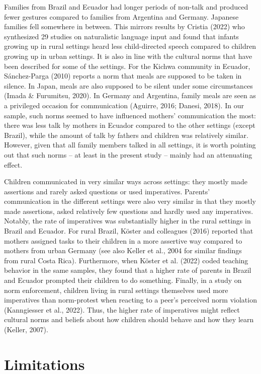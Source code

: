 \documentclass[
  man,floatsintext]{apa6}
\begin{document}
Families from Brazil and Ecuador had longer periods of non-talk and produced fewer gestures compared to families from Argentina and Germany. Japanese families fell somewhere in between. This mirrors results by Cristia (2022) who synthesized 29 studies on naturalistic language input and found that infants growing up in rural settings heard less child-directed speech compared to children growing up in urban settings. It is also in line with the cultural norms that have been described for some of the settings. For the Kichwa community in Ecuador, Sánchez-Parga (2010) reports a norm that meals are supposed to be taken in silence. In Japan, meals are also supposed to be silent under some circumstances (Imada \& Furumitsu, 2020). In Germany and Argentina, family meals are seen as a privileged occasion for communication (Aguirre, 2016; Danesi, 2018). In our sample, such norms seemed to have influenced mothers' communication the most: there was less talk by mothers in Ecuador compared to the other settings (except Brazil), while the amount of talk by fathers and children was relatively similar. However, given that all family members talked in all settings, it is worth pointing out that such norms -- at least in the present study -- mainly had an attenuating effect.

Children communicated in very similar ways across settings: they mostly made assertions and rarely asked questions or used imperatives. Parents' communication in the different settings were also very similar in that they mostly made assertions, asked relatively few questions and hardly used any imperatives. Notably, the rate of imperatives was substantially higher in the rural settings in Brazil and Ecuador. For rural Brazil, Köster and colleagues (2016) reported that mothers assigned tasks to their children in a more assertive way compared to mothers from urban Germany (see also Keller et al., 2004 for similar findings from rural Costa Rica). Furthermore, when Köster et al. (2022) coded teaching behavior in the same samples, they found that a higher rate of parents in Brazil and Ecuador prompted their children to do something. Finally, in a study on norm enforcement, children living in rural settings themselves used more imperatives than norm-protest when reacting to a peer's perceived norm violation (Kanngiesser et al., 2022). Thus, the higher rate of imperatives might reflect cultural norms and beliefs about how children should behave and how they learn (Keller, 2007).

\hypertarget{limitations}{%
\section{Limitations}\label{limitations}}
\end{document}

